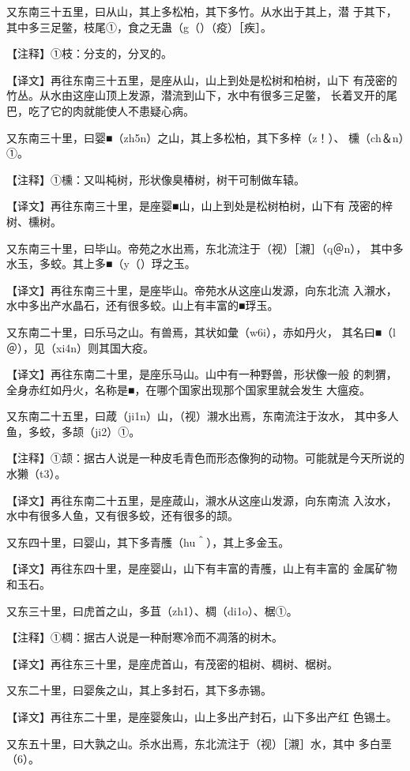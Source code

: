 \documentclass[a4paper,12pt,UTF8,twoside]{ctexbook}
\begin{document}
又东南三十五里，曰从山，其上多松柏，其下多竹。从水出于其上，潜 于其下，其中多三足鳖，枝尾①，食之无蛊（g（）（疫）［疾］。

【注释】①枝：分支的，分叉的。

【译文】再往东南三十五里，是座从山，山上到处是松树和柏树，山下 有茂密的竹丛。从水由这座山顶上发源，潜流到山下，水中有很多三足鳖， 长着叉开的尾巴，吃了它的肉就能使人不患疑心病。

又东南三十里，曰婴■（zh5n）之山，其上多松柏，其下多梓（z！）、 櫄（ch＆n）①。

【注释】①櫄：又叫杶树，形状像臭椿树，树干可制做车辕。

【译文】再往东南三十里，是座婴■山，山上到处是松树柏树，山下有 茂密的梓树、櫄树。

又东南三十里，曰毕山。帝苑之水出焉，东北流注于（视）［瀙］（q＠n）， 其中多水玉，多蛟。其上多■（y（）琈之玉。

【译文】再往东南三十里，是座毕山。帝苑水从这座山发源，向东北流 入瀙水，水中多出产水晶石，还有很多蛟。山上有丰富的■琈玉。

又东南二十里，曰乐马之山。有兽焉，其状如彙（w6i），赤如丹火， 其名曰■（l＠），见（xi4n）则其国大疫。

【译文】再往东南二十里，是座乐马山。山中有一种野兽，形状像一般 的刺猬，全身赤红如丹火，名称是■，在哪个国家出现那个国家里就会发生 大瘟疫。

又东南二十五里，曰葴（ji1n）山，（视）瀙水出焉，东南流注于汝水， 其中多人鱼，多蛟，多颉（ji2）①。

【注释】①颉：据古人说是一种皮毛青色而形态像狗的动物。可能就是今天所说的水獭（t3）。

【译文】再往东南二十五里，是座葴山，瀙水从这座山发源，向东南流 入汝水，水中有很多人鱼，又有很多蛟，还有很多的颉。

又东四十里，曰婴山，其下多青雘（hu＾），其上多金玉。

【译文】再往东四十里，是座婴山，山下有丰富的青雘，山上有丰富的 金属矿物和玉石。

又东三十里，曰虎首之山，多苴（zh1）、椆（di1o）、椐①。

【注释】①椆：据古人说是一种耐寒冷而不凋落的树木。

【译文】再往东三十里，是座虎首山，有茂密的柤树、椆树、椐树。

又东二十里，曰婴矦之山，其上多封石，其下多赤锡。

【译文】再往东二十里，是座婴矦山，山上多出产封石，山下多出产红 色锡土。

又东五十里，曰大孰之山。杀水出焉，东北流注于（视）［瀙］水，其中 多白垩（6）。
\end{document}
